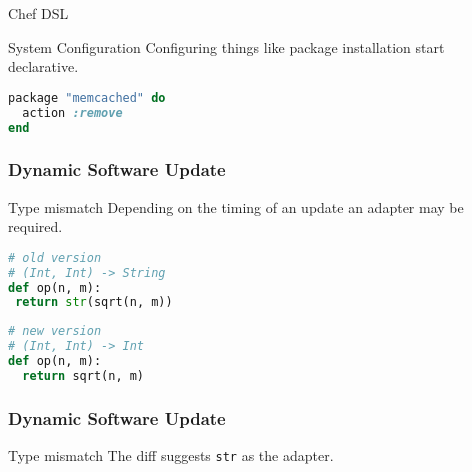 \documentclass{beamer}
\begin{document}
\begin{frame}[fragile]{Chef DSL}
  \begin{block}{System Configuration}
    Configuring things like package installation start declarative.
  \end{block}

  \begin{example}
    \begin{center}
      \begin{minipage}{.48\textwidth}
        
        \vspace{0.9cm}
      \end{minipage}
      \hfill
      \begin{minipage}{.48\textwidth}
        \begin{lstlisting}[language=ruby]
package "memcached" do
  action :remove
end
        \end{lstlisting}
      \end{minipage}
    \end{center}
  \end{example}
\end{frame}

\begin{frame}[fragile]
  \frametitle{Dynamic Software Update}
  \begin{block}{Type mismatch}
    Depending on the timing of an update an adapter may be required.
  \end{block}

  \begin{example}
    \begin{center}
      \begin{minipage}{.54\textwidth}
        \begin{lstlisting}[language=python]
# old version
# (Int, Int) -> String
def op(n, m):
 return str(sqrt(n, m))
        \end{lstlisting}
      \end{minipage}
      \hfill
      \begin{minipage}{.45\textwidth}
        \begin{lstlisting}[language=python]
# new version
# (Int, Int) -> Int
def op(n, m):
  return sqrt(n, m)
        \end{lstlisting}
      \end{minipage}
    \end{center}
  \end{example}
\end{frame}

\begin{frame}[fragile]
  \frametitle{Dynamic Software Update}
  \begin{block}{Type mismatch}
    The diff suggests \verb|str| as the adapter.
  \end{block}

  \begin{example}
    
  \end{example}
\end{frame}
\end{document}
